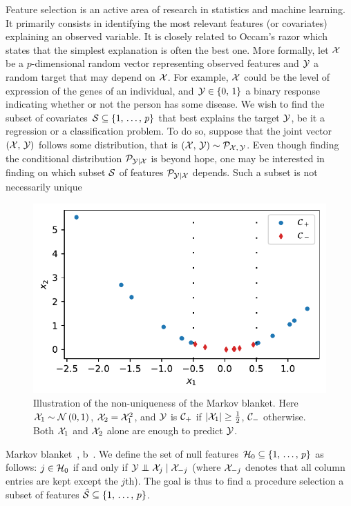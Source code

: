 Feature selection is an active area of research in statistics and machine learning.
It primarily consists in identifying the most relevant features (or covariates) explaining an observed variable.
It is closely related to Occam's razor which states that the simplest explanation is often the best one.
More formally, let $\mathcal{X}$ be a $p$-dimensional random vector representing observed features
and $\mathcal{Y}$ a random target that may depend on $\mathcal{X}$.
For example, $\mathcal{X}$ could be the level of expression of the genes of an individual,
and $\mathcal{Y} \in \left\{ 0,\, 1 \right\}$ a binary response indicating whether or not the person has some disease.
We wish to find the subset of covariates $\mathcal{S} \subseteq \left\{ 1,\, \dots,\, p \right\}$ that best explains the target $\mathcal{Y}$,
be it a regression or a classification problem.
To do so, suppose that the joint vector $\left( \mathcal{X},\, \mathcal{Y} \right)$ follows some distribution,
that is $\left( \mathcal{X},\, \mathcal{Y} \right) \sim \mathcal{P}_{\mathcal{X},\, \mathcal{Y}}$.
Even though finding the conditional distribution $\mathcal{P}_{\mathcal{Y} \mid \mathcal{X}}$ is beyond hope,
one may be interested in finding on which subset $\mathcal{S}$ of features $\mathcal{P}_{\mathcal{Y} \mid \mathcal{X}}$ depends.
Such a subset is not necessarily unique
\begin{figure}
    \includegraphics[width=1\linewidth]{figures/fs_subset_not_unique.pdf}
    \caption{
    Illustration of the non-uniqueness of the Markov blanket.
    Here $\mathcal{X}_1 \sim \mathcal{N}\left( 0, 1 \right)$,
    $\mathcal{X}_2 = \mathcal{X}_1^2$,
    and $\mathcal{Y}$ is $\mathcal{C}_+$ if $\left\lvert\mathcal{X}_1\right\rvert \geq \frac{1}{2}$,
    $\mathcal{C}_-$ otherwise.
    Both $\mathcal{X}_1$ and $\mathcal{X}_2$ alone are enough to predict $\mathcal{Y}$.
    }
    \label{fig:fs_subset_not_unique}
\end{figure}
Markov blanket~\cite{markov_blanket}, b~\cite{markov_blanket_fs}.
We define the set of null features $\mathcal{H}_0 \subseteq \left\{ 1,\, \dots,\, p \right\}$ as follows:
$j \in \mathcal{H}_0$ if and only if $\cY \independent \cX_j \mid \cX_{-j}$
(where $\mathcal{X}_{-j}$ denotes that all column entries are kept except the $j$th).
The goal is thus to find a procedure selection a subset of features
$\hat{\mathcal{S}} \subseteq \left\{ 1,\, \dots,\, p \right\}$.

